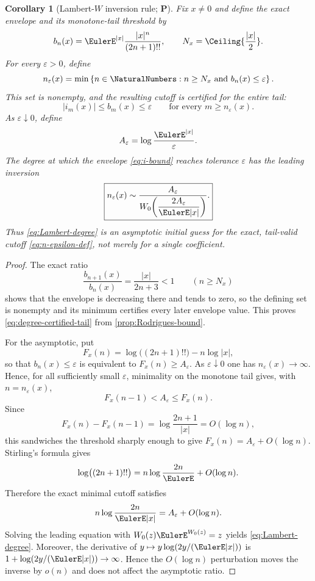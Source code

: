 \documentclass[11pt,oneside]{article}
\newtheorem{corollary}[theorem]{Corollary}
\theoremstyle{definition}
\theoremstyle{remark}
\newcommand{\statusP}{\textcolor{deepgreen}{\textbf{P}}}
\begin{document}
\begin{corollary}[Lambert-$W$ inversion rule; \statusP]
\label{cor:Lambert-degree}
Fix $x\ne0$ and define the exact envelope and its monotone-tail threshold by
\begin{equation}
 b_n(x)=\EulerE^{|x|}\frac{|x|^n}{(2n+1)!!},
 \qquad
 N_x=\Ceiling{\frac{|x|}{2}}.
 \label{eq:degree-envelope}
\end{equation}
For every $\varepsilon>0$, define
\begin{equation}
 n_\varepsilon(x)=
 \min\left\{n\in\NaturalNumbers:n\ge N_x\ \text{and}\ b_n(x)\le\varepsilon\right\}.
 \label{eq:n-epsilon-def}
\end{equation}
This set is nonempty, and the resulting cutoff is certified for the entire
tail:
\begin{equation}
 |i_m(x)|\le b_m(x)\le\varepsilon
 \qquad\text{for every }m\ge n_\varepsilon(x).
 \label{eq:degree-certified-tail}
\end{equation}
As $\varepsilon\downarrow0$, define
\begin{equation}
 A_\varepsilon=\log\frac{\EulerE^{|x|}}{\varepsilon}.
 \label{eq:A-epsilon}
\end{equation}
The degree at which the envelope \eqref{eq:i-bound} reaches tolerance
$\varepsilon$ has the leading inversion
\begin{equation}
 \boxed{
 n_\varepsilon(x)
 \sim\frac{A_\varepsilon}
 {W_0\!\left(\dfrac{2A_\varepsilon}{\EulerE|x|}\right)}.}
 \label{eq:Lambert-degree}
\end{equation}
Thus \eqref{eq:Lambert-degree} is an asymptotic initial guess for the exact,
tail-valid cutoff \eqref{eq:n-epsilon-def}, not merely for a single coefficient.
\end{corollary}

\begin{proof}
The exact ratio
\[
 \frac{b_{n+1}(x)}{b_n(x)}=\frac{|x|}{2n+3}<1
 \qquad(n\ge N_x)
\]
shows that the envelope is decreasing there and tends to zero, so the defining
set is nonempty and its minimum certifies every later envelope value.  This
proves \eqref{eq:degree-certified-tail} from
\cref{prop:Rodrigues-bound}.

For the asymptotic, put
\[
 F_x(n)=\log\bigl((2n+1)!!\bigr)-n\log|x|,
\]
so that $b_n(x)\le\varepsilon$ is equivalent to
$F_x(n)\ge A_\varepsilon$.  As $\varepsilon\downarrow0$ one has
$n_\varepsilon(x)\to\infty$.  Hence, for all sufficiently small
$\varepsilon$, minimality on the monotone tail gives, with
$n=n_\varepsilon(x)$,
\[
 F_x(n-1)<A_\varepsilon\le F_x(n).
\]
Since
\[
 F_x(n)-F_x(n-1)=\log\frac{2n+1}{|x|}=O(\log n),
\]
this sandwiches the threshold sharply enough to give
$F_x(n)=A_\varepsilon+O(\log n)$.  Stirling's formula gives
\[
 \log\bigl((2n+1)!!\bigr)
 =n\log\frac{2n}{\EulerE}+O(\log n).
\]
Therefore the exact minimal cutoff satisfies
\[
 n\log\frac{2n}{\EulerE|x|}=A_\varepsilon+O(\log n).
\]
Solving the leading equation with $W_0(z)\EulerE^{W_0(z)}=z$ yields
\eqref{eq:Lambert-degree}.  Moreover, the derivative of
$y\mapsto y\log(2y/(\EulerE|x|))$ is
$1+\log(2y/(\EulerE|x|))\to\infty$.  Hence the $O(\log n)$ perturbation moves the
inverse by $o(n)$ and does not affect the asymptotic ratio.
\end{proof}
\end{document}
